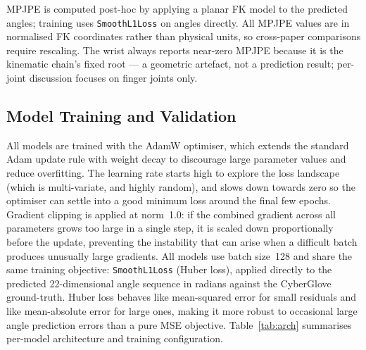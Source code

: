 \documentclass[11pt]{article}
\begin{document}
MPJPE is computed post-hoc by applying a planar FK model to the predicted angles; training uses \texttt{SmoothL1Loss} on angles directly. All MPJPE values are in normalised FK coordinates rather than physical units, so cross-paper comparisons require rescaling. The wrist always reports near-zero MPJPE because it is the kinematic chain's fixed root — a geometric artefact, not a prediction result; per-joint discussion focuses on finger joints only.

\subsection{Model Training and Validation}

All models are trained with the AdamW optimiser, which extends the standard Adam update rule with weight decay to discourage large parameter values and reduce overfitting. The learning rate starts high to explore the loss landscape (which is multi-variate, and highly random), and slows down towards zero so the optimiser can settle into a good minimum loss around the final few epochs. Gradient clipping is applied at norm~1.0: if the combined gradient across all parameters grows too large in a single step, it is scaled down proportionally before the update, preventing the instability that can arise when a difficult batch produces unusually large gradients. All models use batch size~128 and share the same training objective: \texttt{SmoothL1Loss} (Huber loss), applied directly to the predicted 22-dimensional angle sequence in radians against the CyberGlove ground-truth. Huber loss behaves like mean-squared error for small residuals and like mean-absolute error for large ones, making it more robust to occasional large angle prediction errors than a pure MSE objective. Table~\ref{tab:arch} summarises per-model architecture and training configuration.
\end{document}
